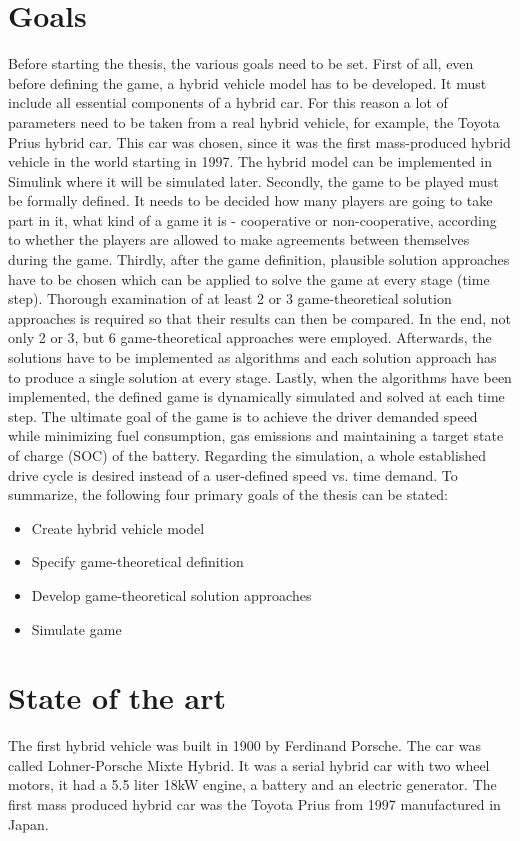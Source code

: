 \section{Goals}
Before starting the thesis, the various goals need to be set. First of all, even before defining the game, a hybrid vehicle model has to be developed. It must include all essential components of a hybrid car. For this reason a lot of parameters need to be taken from a real hybrid vehicle, for example, the Toyota Prius hybrid car. This car was chosen, since it was the first mass-produced hybrid vehicle in the world starting in 1997. The hybrid model can be implemented in Simulink where it will be simulated later. Secondly, the game to be played must be formally defined. It needs to be decided how many players are going to take part in it, what kind of a game it is - cooperative or non-cooperative, according to whether the players are allowed to make agreements between themselves during the game. Thirdly, after the game definition, plausible solution approaches have to be chosen which can be applied to solve the game at every stage (time step). Thorough examination of at least 2 or 3 game-theoretical solution approaches is required so that their results can then be compared. In the end, not only 2 or 3, but 6 game-theoretical approaches were employed.  Afterwards, the solutions have to be implemented as algorithms and each solution approach has to produce a single solution at every stage. Lastly, when the algorithms have been implemented, the defined game is dynamically simulated and solved at each time step. The ultimate goal of the game is to achieve the driver demanded speed while minimizing fuel consumption, gas emissions and maintaining a target state of charge (SOC) of the battery. Regarding the simulation, a whole established drive cycle is desired instead of a user-defined speed vs. time demand. To summarize, the following four primary goals of the thesis can be stated:

\begin{itemize}
\item Create hybrid vehicle model
\item Specify game-theoretical definition
\item Develop game-theoretical solution approaches
\item Simulate game
\end{itemize}

\section{State of the art} 
The first hybrid vehicle was built in 1900 by Ferdinand Porsche. The car was called Lohner-Porsche Mixte Hybrid. It was a serial hybrid car with two wheel motors, it had a 5.5 liter 18kW engine, a battery and an electric generator. The first mass produced hybrid car was the Toyota Prius from 1997 manufactured in Japan.

